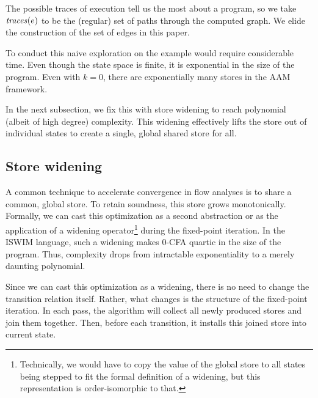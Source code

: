 \documentclass[9pt]{sigplanconf} %
\newcommand{\naive}{naive}
\begin{document}
The possible traces of execution tell us the most about a program, so
we take $\mathit{traces}(e)$ to be the (regular) set of paths through the
computed graph. We elide the construction of the set of edges in this paper.

To conduct this \naive{} exploration on the \Church{} example would require
considerable time.  Even though the state space is finite, it is exponential in
the size of the program.  Even with $k = 0$, there are exponentially many
stores in the AAM framework.

In the next subsection, we fix this with store widening to reach polynomial
(albeit of high degree) complexity.
%
This widening effectively lifts the store out of individual states to create
a single, global shared store for all.


\subsection{Store widening}
\label{sec:storewiden}

A common technique to accelerate convergence in flow analyses is to share a
common, global store.
%
To retain soundness, this store grows monotonically.
%
Formally, we can cast this optimization as a second abstraction or as
the application of a widening operator\footnote{Technically, we would
  have to copy the value of the global store to all states being
  stepped to fit the formal definition of a widening, but this
  representation is order-isomorphic to that.} during the fixed-point
iteration.
%
In the ISWIM language, such a widening makes 0-CFA quartic in the size of the
program.
%
Thus, complexity drops from intractable exponentiality to a merely
daunting polynomial.

Since we can cast this optimization as a widening, there is no need to change
the transition relation itself.
%
Rather, what changes is the structure of the fixed-point iteration.
%
In each pass, the algorithm will collect all newly produced stores and join
them together.
%
Then, before each transition, it installs this joined store into current
state.
\end{document}
